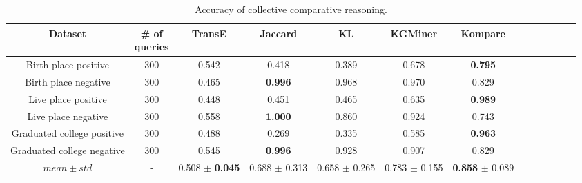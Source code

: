 \begin{table}[!htbp]
	\centering
	\caption{Accuracy of collective comparative reasoning.}
	\fontsize{9}{9}\selectfont
	\setlength\tabcolsep{0.8pt}
	\begin{tabular}{|c|c|c|c|c|c|c|c|c|c|c|c|c|}
	\hline
	Dataset       & \makecell{\# of \\ queries}   & TransE & Jaccard  & KL  & KGMiner & Kompare \\ \hline
    Birth place positive   & 300     & 0.542 & 0.418 & 0.389 & 0.678 & \textbf{0.795} \\ \hline
    Birth place negative   & 300     & 0.465 & \textbf{0.996} & 0.968 & 0.970 & 0.829 \\ \hline
    Live place positive    & 300     & 0.448 & 0.451 & 0.465 & 0.635 & \textbf{0.989} \\ \hline
    Live place negative    & 300     & 0.558 & \textbf{1.000} & 0.860 & 0.924 & 0.743 \\ \hline
    Graduated college positive & 300  & 0.488 & 0.269 & 0.335 & 0.585 & \textbf{0.963} \\ \hline
    Graduated college negative & 300  & 0.545 & \textbf{0.996} & 0.928 & 0.907 & 0.829 \\ \hline

    $mean \pm std$ & - & 0.508 $\pm$ \textbf{0.045}  & 0.688 $\pm$ 0.313 & 0.658 $\pm$ 0.265 & 0.783 $\pm$ 0.155 & \textbf{0.858} $\pm$ 0.089  \\ \hline
	\end{tabular}
\label{coll_dataset}
\end{table}


